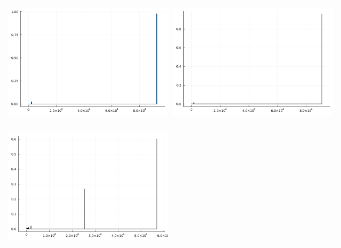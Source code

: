 \documentclass{juliacon}
\begin{document}
\begin{figure}[!ht]
  \centerline{
    \includegraphics[width=10pc]{figures/experiments/pbmc_30/hist_1.png}
    \includegraphics[width=10pc]{figures/experiments/pbmc_30/hist_2.png}
  }
  \centerline{
    \includegraphics[width=10pc]{figures/experiments/pbmc_30/hist_3.png}
}
\end{figure}
\end{document}
